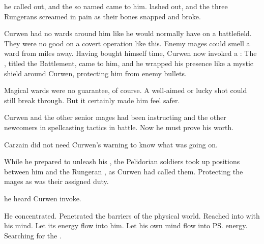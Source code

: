 \ta{\Djerzad!} he called out, and the \qliphah{} so named came to him. 
\Djerzad{} lashed out, and the three Rungerans screamed in pain as their bones snapped and broke. 

Curwen had no wards around him like he would normally have on a battlefield. 
They were no good on a covert operation like this. 
Enemy mages could smell a ward from miles away. 
Having bought himself time, Curwen now invoked a \sephirah: 
\ta{\Hoshied!} 
The \sephirah{}, titled the Battlement, came to him, and he wrapped his presence like a mystic shield around Curwen, protecting him from enemy bullets. 

Magical wards were no guarantee, of course. 
A well-aimed or lucky shot could still break through. 
But it certainly made him feel safer. 

Curwen and the other senior mages had been instructing \Shireyo{} and the other newcomers in spellcasting tactics in battle. 
Now he must prove his worth. 









\begin{comment}
\subsection{Carzain fights}
\end{comment}
\new
Carzain did not need Curwen's warning to know what was going on. 

While he prepared to unleash his \Archons, the Pelidorian soldiers took up positions between him and the Rungeran , as Curwen had called them. 
Protecting the mages as was their assigned duty. 

\ta{\Hoshied!} he heard Curwen invoke. 

He concentrated. 
Penetrated the barriers of the physical world. 
Reached into \Iquin{} with his mind. 
Let its energy flow into him. 
Let his own mind flow into \ps{\Iquin} energy. 
Searching for the \sephirah. 

